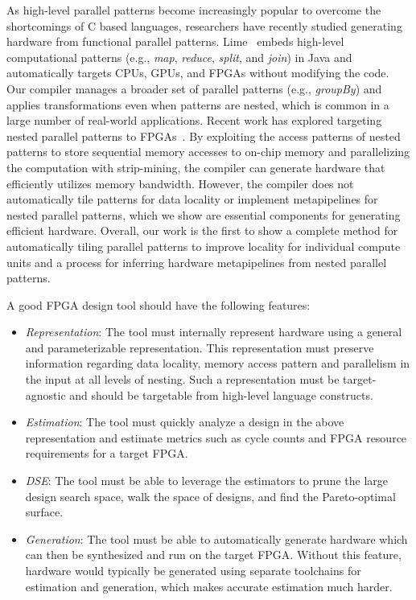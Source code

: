 As high-level parallel patterns become increasingly popular to overcome the
shortcomings of C based languages, researchers have recently studied generating
hardware from functional parallel patterns.  Lime~\cite{auerbach10lime}
embeds high-level computational patterns (e.g., \emph{map}, \emph{reduce}, \emph{split}, and \emph{join}) in
Java and automatically targets CPUs, GPUs, and FPGAs without modifying the
code.  Our compiler manages a broader set of parallel patterns (e.g., \emph{groupBy})
and applies transformations even when patterns are nested,
which is common in a large number of real-world applications.  Recent work has
explored targeting nested parallel patterns to
FPGAs~\cite{george14fpl}. By exploiting the access patterns of nested patterns
to store sequential memory accesses to on-chip memory and parallelizing the
computation with strip-mining, the compiler can generate hardware that
efficiently utilizes memory bandwidth.  However, the compiler does not
automatically tile patterns for data locality or implement metapipelines
for nested parallel patterns, which we show are essential components for generating efficient hardware. Overall, our work is the first to show a complete method for
automatically tiling parallel patterns to improve locality for individual compute units and a process
for inferring hardware metapipelines from nested parallel patterns.

A good FPGA design tool should have the following features:
\begin{itemize}
  \item \emph{Representation}: The tool must internally represent hardware using a general and parameterizable
    representation. This representation must preserve information regarding data locality,
    memory access pattern and parallelism in the input at all levels of nesting.
    Such a representation must be target-agnostic and should be targetable from high-level
    language constructs.
  \item \emph{Estimation}: The tool must quickly analyze a design in the above representation
    and estimate metrics such as cycle counts and FPGA resource requirements for a target FPGA.
  \item \emph{DSE}: The tool must be able to leverage the estimators to prune the large design search space,
    walk the space of designs, and find the Pareto-optimal surface.
  \item \emph{Generation}: The tool must be able to automatically generate hardware which can then be
    synthesized and run on the target FPGA. Without this feature, hardware would typically
    be generated using separate toolchains for estimation and generation, which makes
    accurate estimation much harder.
\end{itemize}


